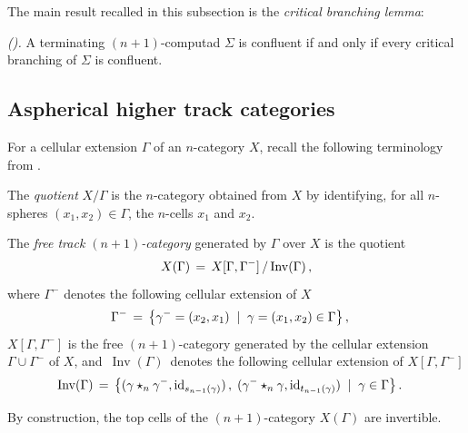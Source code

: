\documentclass[reqno,12pt]{amsart}
\begin{document}
The main result recalled in this subsection is the \emph{critical branching lemma}:

\begin{theorem}\label{lem: crit branch lemma} \emph{(\cite[Thm. 2.5.4]{Gu19}).}
	A terminating $(n+1)$-computad \(\Sigma\) is confluent if and only if every critical branching of \(\Sigma\) is confluent.
\end{theorem}

\subsection{Aspherical higher track categories}\label{sec: hombasis}

For a cellular extension  $\Gamma$ of an $n$-category $X$, recall the following terminology from \cite[\S 1.1.2]{GuMa12}.

\begin{definition}
The \emph{quotient} $X/\Gamma$ is the $n$-category obtained from $X$ by identifying, for all $n$-spheres 
$(x_1,x_2)\in \Gamma$, the $n$-cells $x_1$ and 
$x_2$.
\end{definition}

\begin{definition}
The \emph{free track $(n+1)$-category} generated by $\Gamma$ over $X$ is the quotient
\begin{equation*}
	X(\Gamma) \,=\, X[\Gamma,\Gamma^{-}]\,/\,{\operatorname{Inv}(\Gamma)}\,,
\end{equation*}
where $\Gamma^{-}$ denotes the following cellular extension of $X$
\begin{align*}
	\Gamma^{-} &\,=\, \big\{\gamma^{-}=(x_2,x_1) \;\;\vert\;\; \gamma=(x_1,x_2)\in \Gamma\big\}\,,
\end{align*}
$X[\Gamma,\Gamma^{-}]$ is the free $(n+1)$-category generated by the cellular extension $\Gamma \cup \Gamma^{-}$ of $X$, and~$\operatorname{Inv}(\Gamma)$~denotes the following cellular extension of $X[\Gamma,\Gamma^{-}]$
\begin{align*}
	\operatorname{Inv}(\Gamma) &\,=\, \big\{(\gamma \star_n \gamma^{-},{\operatorname{id}}_{s_{n-1}(\gamma)})\,,\; (\gamma^{-} \star_n \gamma,{\operatorname{id}}_{t_{n-1}(\gamma)}) \;\;\vert\;\; \gamma \in \Gamma\big\}\,.
\end{align*}
\end{definition}

\begin{remark}
	By construction, the top cells of the $(n+1)$-category $X(\Gamma)$ are invertible.
\end{remark}
\end{document}
